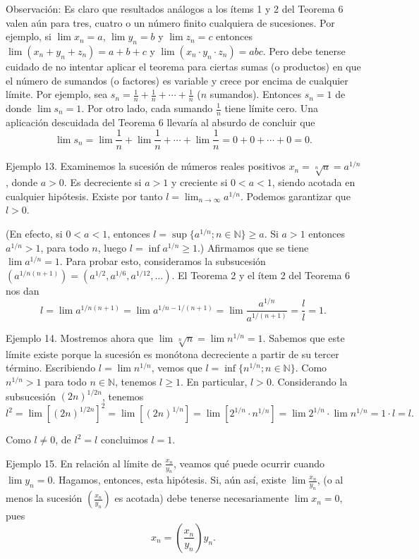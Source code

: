 \documentclass[12pt,oneside]{book}
\begin{document}
Observación: Es claro que resultados análogos a los ítems 1 y 2 del Teorema 6 valen aún para tres, cuatro o un número finito cualquiera de sucesiones. Por ejemplo, si \(\lim x_n = a\), \(\lim y_n = b\) y \(\lim z_n = c\) entonces \(\lim(x_n + y_n + z_n) = a + b + c\) y \(\lim(x_n \cdot y_n \cdot z_n) = abc\). Pero debe tenerse cuidado de no intentar aplicar el teorema para ciertas sumas (o productos) en que el número de sumandos (o factores) es variable y crece por encima de cualquier límite. Por ejemplo, sea \(s_n = \frac{1}{n} + \frac{1}{n} + \cdots + \frac{1}{n}\) (\(n\) sumandos). Entonces \(s_n = 1\) de donde \(\lim s_n = 1\). Por otro lado, cada sumando \(\frac{1}{n}\) tiene límite cero. Una aplicación descuidada del Teorema 6 llevaría al absurdo de concluir que
\[\lim s_n = \lim \frac{1}{n} + \lim \frac{1}{n} + \cdots + \lim \frac{1}{n} = 0 + 0 + \cdots + 0 = 0.\]

Ejemplo 13. Examinemos la sucesión de números reales positivos \(x_n = \sqrt[n]{a} = a^{1/n}\), donde \(a > 0\). Es decreciente si \(a > 1\) y creciente si \(0 < a < 1\), siendo acotada en cualquier hipótesis. Existe por tanto \(l = \lim_{n \to \infty} a^{1/n}\). Podemos garantizar que \(l > 0\).

(En efecto, si \(0 < a < 1\), entonces \(l = \sup\{a^{1/n}; n \in \mathbb{N}\} \geq a\). Si \(a > 1\) entonces \(a^{1/n} > 1\), para todo \(n\), luego \(l = \inf a^{1/n} \geq 1\).) Afirmamos que se tiene \(\lim a^{1/n} = 1\). Para probar esto, consideramos la subsucesión \((a^{1/n(n+1)}) = (a^{1/2}, a^{1/6}, a^{1/12}, \ldots)\). El Teorema 2 y el ítem 2 del Teorema 6 nos dan
\[l = \lim a^{1/n(n+1)} = \lim a^{1/n - 1/(n+1)} = \lim \frac{a^{1/n}}{a^{1/(n+1)}} = \frac{l}{l} = 1.\]

Ejemplo 14. Mostremos ahora que \(\lim \sqrt[n]{n} = \lim n^{1/n} = 1\). Sabemos que este límite existe porque la sucesión es monótona decreciente a partir de su tercer término. Escribiendo \(l = \lim n^{1/n}\), vemos que \(l = \inf\{n^{1/n}; n \in \mathbb{N}\}\). Como \(n^{1/n} > 1\) para todo \(n \in \mathbb{N}\), tenemos \(l \geq 1\). En particular, \(l > 0\). Considerando la subsucesión \((2n)^{1/2n}\), tenemos
\[l^2 = \lim[(2n)^{1/2n}]^2 = \lim[(2n)^{1/n}] = \lim[2^{1/n} \cdot n^{1/n}] = \lim 2^{1/n} \cdot \lim n^{1/n} = 1 \cdot l = l.\]

Como \( l \neq 0 \), de \( l^2 = l \) concluimos \( l = 1 \).

Ejemplo 15. En relación al límite de \( \frac{x_n}{y_n} \), veamos qué puede ocurrir cuando \( \lim y_n = 0 \). Hagamos, entonces, esta hipótesis. Si, aún así, existe \( \lim \frac{x_n}{y_n} \), (o al menos la sucesión \( \left( \frac{x_n}{y_n} \right) \) es acotada) debe tenerse necesariamente \( \lim x_n = 0 \), pues
\[x_n = \left( \frac{x_n}{y_n} \right) y_n.\]
\end{document}

